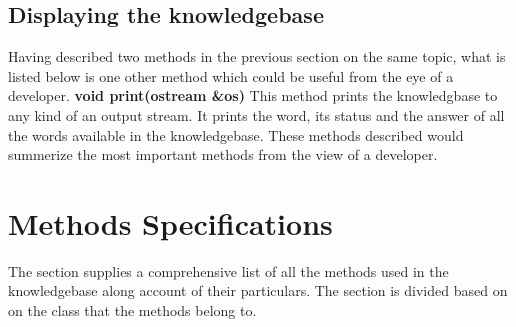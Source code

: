 \subsection*{Displaying the knowledgebase}
	Having described two methods in the previous section on the same topic, what is listed below is one other method which could be useful from the eye of a developer. \vskip 2pt
\textbf{void print(ostream \&os)} \vskip 1pt
	This method prints the knowledgbase to any kind of an output stream. It prints the word, its status and the answer of all the words available in the knowledgebase.
\vskip 1pt
These methods described would summerize the most important methods from the view of a developer.

	
\section{Methods Specifications}
The section supplies a comprehensive list of all the methods used in the knowledgebase along account of their particulars. The section is divided based on on the class that the methods belong to.
